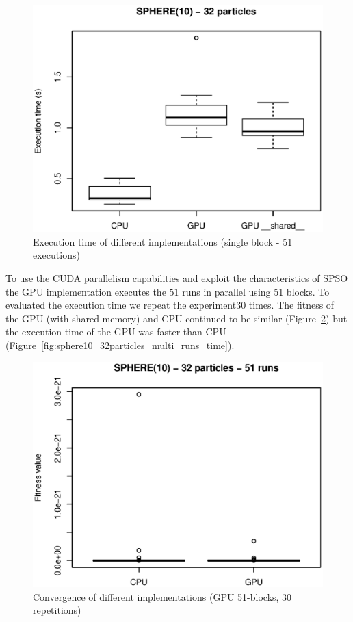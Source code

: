 \documentclass{article}
\begin{document}
    \begin{figure}[!htb]
        \centering
        \includegraphics[width=.7\textwidth]{../img/sphere10_32particles_time.eps}
        \caption{Execution time of different implementations (single block - 51 executions)} 
        \label{fig:sphere10_32particles_time}
    \end{figure}


    To use the CUDA parallelism capabilities and exploit the characteristics of SPSO the GPU implementation executes the $51$ runs in parallel using 51 blocks. To evaluated the execution time we repeat the experiment30 times. The fitness of the GPU (with shared memory) and CPU continued to be similar (Figure~\ref{fig:sphere10_32particles_multi_runs_fitness}) but the execution time of the GPU was faster than CPU (Figure~\ref{fig:sphere10_32particles_multi_runs_time}).

    \begin{figure}[!htb]
        \centering
        \includegraphics[width=.7\textwidth]{../img/sphere10_32particles_multi_runs_fitness.eps}
        \caption{Convergence of different implementations (GPU 51-blocks, 30 repetitions)}
        \label{fig:sphere10_32particles_multi_runs_fitness}
    \end{figure}
\end{document}
